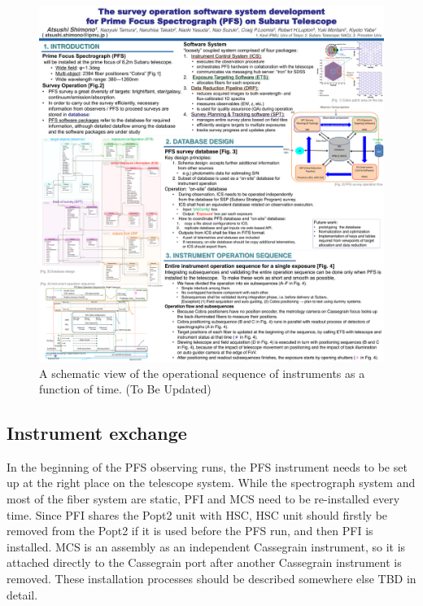 \documentclass[a4paper]{article}
\begin{document}
\begin{figure}[!htb]
\begin{center}
\includegraphics[scale=0.5]{./figures/PFS_Operational_Sequence_for_Single_Exposure_SPIE2016.pdf}
\end{center}
\caption{A schematic view of the operational sequence of instruments as a function of time. (To Be Updated) \label{fig:single_exposure_sequence1}}
\end{figure}

\subsection{Instrument exchange}
In the beginning of the PFS observing runs, the PFS instrument needs
to be set up at the right place on the telescope system. While the
spectrograph system and most of the fiber system are static, PFI and
MCS need to be re-installed every time. Since PFI shares the Popt2
unit with HSC, HSC unit should firstly be removed from the Popt2 if it
is used before the PFS run, and then PFI is installed. MCS is an
assembly as an independent Cassegrain instrument, so it is attached
directly to the Cassegrain port after another Cassegrain instrument is
removed. These installation processes should be described somewhere
else TBD in detail.\\
\end{document}
